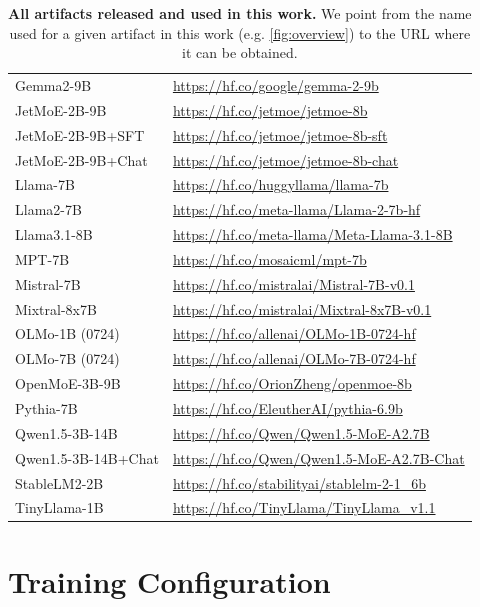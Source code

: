 \documentclass{article}
\begin{document}
\begin{table}[htbp]
\begin{tabular}{l|l}
Gemma2-9B & \url{https://hf.co/google/gemma-2-9b} \\
JetMoE-2B-9B & \url{https://hf.co/jetmoe/jetmoe-8b} \\
JetMoE-2B-9B+SFT & \url{https://hf.co/jetmoe/jetmoe-8b-sft} \\
JetMoE-2B-9B+Chat & \url{https://hf.co/jetmoe/jetmoe-8b-chat} \\
Llama-7B & \url{https://hf.co/huggyllama/llama-7b} \\
Llama2-7B & \url{https://hf.co/meta-llama/Llama-2-7b-hf} \\
Llama3.1-8B & \url{https://hf.co/meta-llama/Meta-Llama-3.1-8B} \\
MPT-7B & \url{https://hf.co/mosaicml/mpt-7b} \\
Mistral-7B & \url{https://hf.co/mistralai/Mistral-7B-v0.1} \\
Mixtral-8x7B & \url{https://hf.co/mistralai/Mixtral-8x7B-v0.1} \\
OLMo-1B (0724) & \url{https://hf.co/allenai/OLMo-1B-0724-hf} \\
OLMo-7B (0724) & \url{https://hf.co/allenai/OLMo-7B-0724-hf} \\
OpenMoE-3B-9B & \url{https://hf.co/OrionZheng/openmoe-8b} \\
Pythia-7B & \url{https://hf.co/EleutherAI/pythia-6.9b} \\
Qwen1.5-3B-14B & \url{https://hf.co/Qwen/Qwen1.5-MoE-A2.7B} \\
Qwen1.5-3B-14B+Chat & \url{https://hf.co/Qwen/Qwen1.5-MoE-A2.7B-Chat} \\
StableLM2-2B & \url{https://hf.co/stabilityai/stablelm-2-1_6b} \\
TinyLlama-1B & 
\url{https://hf.co/TinyLlama/TinyLlama_v1.1} \\
\bottomrule
\end{tabular}
\vspace{1em}
\caption{\textbf{All artifacts released and used in this work.} We point from the name used for a given artifact in this work (e.g. \autoref{fig:overview}) to the URL where it can be obtained.}
\label{tab:artifacts}
\end{table}

\section{Training Configuration}
\label{sec:config}
\end{document}
